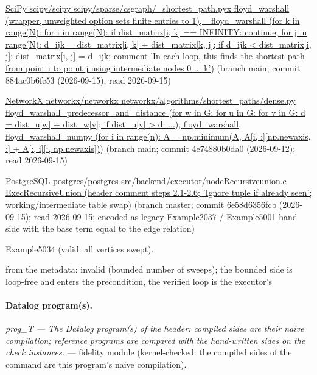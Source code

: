 \documentclass[10pt]{article}
\begin{document}
\begin{description}[leftmargin=2.6cm,style=nextline,itemsep=1pt]
\item[Sources] {\raggedright \href{https://github.com/scipy/scipy/blob/main/scipy/sparse/csgraph/_shortest_path.pyx}{SciPy scipy/scipy scipy/sparse/csgraph/\_shortest\_path.pyx floyd\_warshall (wrapper, unweighted option sets finite entries to 1), \_floyd\_warshall (for k in range(N): for i in range(N): if dist\_matrix[i, k] == INFINITY: continue; for j in range(N): d\_ijk = dist\_matrix[i, k] + dist\_matrix[k, j]; if d\_ijk \textless{} dist\_matrix[i, j]: dist\_matrix[i, j] = d\_ijk; comment 'In each loop, this finds the shortest path from point i to point j using intermediate nodes 0 ... k')} (branch main; commit 884ac0b6fc53 (2026-09-15); read 2026-09-15) \par \href{https://github.com/networkx/networkx/blob/main/networkx/algorithms/shortest_paths/dense.py}{NetworkX networkx/networkx networkx/algorithms/shortest\_paths/dense.py floyd\_warshall\_predecessor\_and\_distance (for w in G: for u in G: for v in G: d = dist\_u[w] + dist\_w[v]; if dist\_u[v] \textgreater{} d: ...), floyd\_warshall, floyd\_warshall\_numpy (for i in range(n): A = np.minimum(A, A[i, :][np.newaxis, :] + A[:, i][:, np.newaxis]))} (branch main; commit 4e74880b0da0 (2026-09-12); read 2026-09-15) \par \href{https://github.com/postgres/postgres/blob/master/src/backend/executor/nodeRecursiveunion.c}{PostgreSQL postgres/postgres src/backend/executor/nodeRecursiveunion.c ExecRecursiveUnion (header comment steps 2.1-2.6; 'Ignore tuple if already seen'; working/intermediate table swap)} (branch master; commit 6e58d6356fcb (2026-09-15); read 2026-09-15; encoded as legacy Example2037 / Example5001 hand side with the base term equal to the edge relation)\par}

\item[Twin] Example5034 (valid: all vertices swept).

\item[Obstruction note] from the metadata: invalid (bounded number of sweeps); the bounded side is loop-free and enters the precondition, the verified loop is the executor's

\end{description}

\paragraph{Datalog program(s).}

{\raggedright\textit{prog\_T --- The Datalog program(s) of the header: compiled sides are their naive compilation; reference programs are compared with the hand-written sides on the check instances.} --- fidelity module (kernel-checked: the compiled sides of the command are this program's naive compilation).\par}
\end{document}
